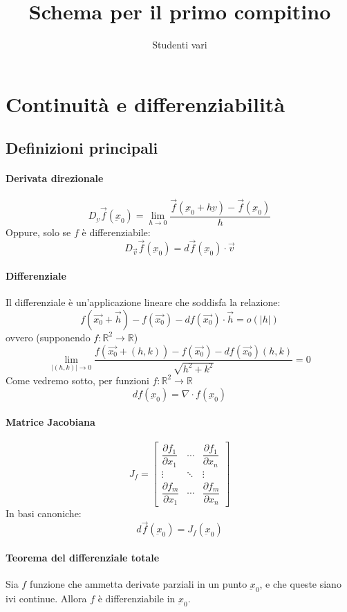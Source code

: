 \documentclass[a4paper,12pt]{book}
\author{Studenti vari}
\title{Schema per il primo compitino}
\begin{document}
\maketitle

\section{Continuità e differenziabilità}
\subsection{Definizioni principali}
\paragraph{Derivata direzionale}
$$D_{\underbar{v}} \vec{f}(\underbar{x}_0) = \lim_{h \to 0}{\dfrac{\vec{f}(\underbar{x}_0+h\underbar{v})-\vec{f}(\underbar{x}_0)}{h}}$$
Oppure, solo se $f$ è differenziabile:
$$D_{\vec{v}} \vec{f}(\underbar{x}_0) = d\vec{f}(\underbar{x}_0)\cdot\vec{v}$$

\paragraph{Differenziale}
Il differenziale è un'applicazione lineare che soddisfa la relazione:
$$f(\vec{x_0}+\vec{h}) - f(\vec{x_0}) - df(\vec{x_0})\cdot\vec{h} = o(|h|)$$
ovvero (supponendo $f:\mathbb{R}^2\rightarrow\mathbb{R}$)
$$ \lim_{|(h, k)| \to 0} \dfrac{f(\vec{x_0}+(h, k)) - f(\vec{x_0}) - df(\vec{x_0})(h, k)}{\sqrt{h^2+k^2}} = 0 $$
Come vedremo sotto, per funzioni $f: \mathbb{R}^2 \rightarrow \mathbb{R}$
$$df(\underbar{x}_0) = \nabla \cdot f(\underbar{x}_0)$$
\paragraph{Matrice Jacobiana}
$$J_f = \begin{bmatrix} \dfrac{\partial f_1}{\partial x_1} & \cdots & \dfrac{\partial f_1}{\partial x_n} \\ \vdots & \ddots & \vdots \\ \dfrac{\partial f_m}{\partial x_1} & \cdots & \dfrac{\partial f_m}{\partial x_n}  \end{bmatrix}$$
In basi canoniche:
$$ d\vec{f}(\underbar{x}_0)= J_f(\underbar{x}_0) $$
\paragraph{Teorema del differenziale totale}
Sia $f$ funzione che ammetta derivate parziali in un punto $\underbar{x}_0$, e che queste siano ivi continue. Allora $f$ è differenziabile in $\underbar{x}_0$.
\end{document}
